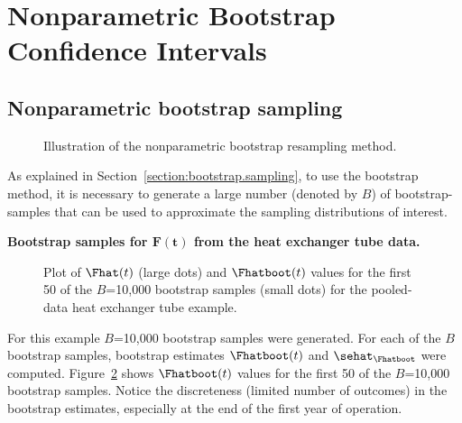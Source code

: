  \section{Nonparametric Bootstrap Confidence Intervals}
\label{section:np.bootstrap}

 \subsection{Nonparametric bootstrap sampling}
\label{section:nonpar.bootstrap}
\begin{figure}
\caption{Illustration of the nonparametric bootstrap
resampling method.}
\label{figure:npbootfig.ps}
\end{figure}
As explained in Section~\ref{section:bootstrap.sampling}, to use the
bootstrap method, it is necessary to generate a large number (denoted
by $B$) of bootstrap-samples that can be used to approximate the
sampling distributions of interest.
\begin{example}
\label{example:heatex.boot.samples}
{\bf Bootstrap samples for $\boldsymbol{F(t)}$ from
the heat exchanger tube data.}  
\begin{figure}
\caption{Plot of 
$\Fhat(t)$ (large dots) and $\Fhatboot(t)$ values 
for the first 50 of the
$B$=10,000 bootstrap samples (small dots) for the pooled-data 
heat exchanger tube example.}
\label{figure:heatexch.boot.cdfplot.ps}
\end{figure}
For this example $B$=10,000 bootstrap samples were generated. For
each of the $B$ bootstrap samples, bootstrap estimates
$\Fhatboot(t)$ and $\sehat_{\Fhatboot}$ were computed.
Figure~\ref{figure:heatexch.boot.cdfplot.ps} shows $\Fhatboot(t)$
values for the first 50 of the $B$=10,000 bootstrap samples. Notice
the discreteness (limited number of outcomes) in the bootstrap
estimates, especially at the end of the first year of operation.
\end{example}


